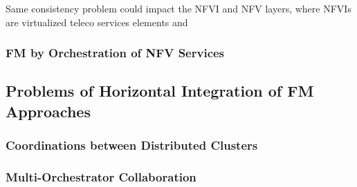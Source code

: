 Same consistency problem could impact the NFVI and NFV layers, where NFVIs are
virtualized teleco services elements and 

\subsubsection{FM by Orchestration of NFV Services}

\subsection{Problems of Horizontal Integration of FM Approaches}

\subsubsection{Coordinations between Distributed Clusters}

\subsubsection{Multi-Orchestrator Collaboration}
